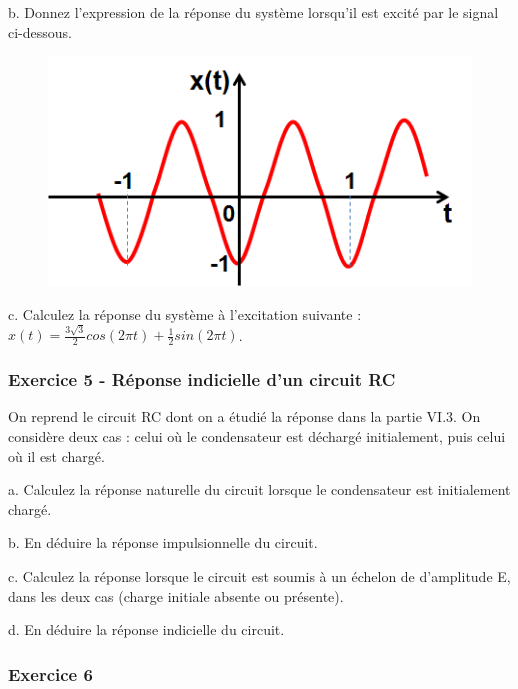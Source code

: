 \begin{remark}{}
	b. Donnez l'expression de la réponse du système lorsqu'il est
        excité par le signal ci-dessous.
	
	\begin{figure}[htbp]
          \centering \includegraphics[scale=0.5]{images/Exo_2_4.png}
	\end{figure}
	
	c. Calculez la réponse du système à l'excitation suivante : $x(t)=\frac{3\sqrt{3}}{2}cos(2\pi t)+\frac{1}{2}sin(2\pi t)$.\\
	
	
	
	\subsubsection{Exercice 5 - Réponse indicielle d'un circuit
          RC}
	
	On reprend le circuit RC dont on a étudié la réponse dans la
        partie VI.3. On considère deux cas : celui où le condensateur
        est déchargé initialement, puis celui où il est chargé.
	
	a. Calculez la réponse naturelle du circuit lorsque le
        condensateur est initialement chargé.
	
	b. En déduire la réponse impulsionnelle du circuit.
	
	c. Calculez la réponse lorsque le circuit est soumis à un
        échelon de \Heaviside{} d'amplitude E, dans les deux cas (charge
        initiale absente ou présente).
	
	d. En déduire la réponse indicielle du circuit.
	
	\vspace{1\baselineskip}
	

	
	\subsubsection{Exercice 6}
	

\end{remark}
